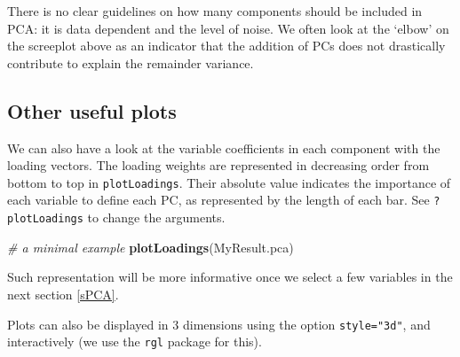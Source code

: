 \documentclass[]{book}
\newenvironment{Shaded}{\begin{snugshade}}{\end{snugshade}}
\newcommand{\KeywordTok}[1]{\textcolor[rgb]{0.13,0.29,0.53}{\textbf{#1}}}
\newcommand{\DataTypeTok}[1]{\textcolor[rgb]{0.13,0.29,0.53}{#1}}
\newcommand{\DecValTok}[1]{\textcolor[rgb]{0.00,0.00,0.81}{#1}}
\newcommand{\FloatTok}[1]{\textcolor[rgb]{0.00,0.00,0.81}{#1}}
\newcommand{\StringTok}[1]{\textcolor[rgb]{0.31,0.60,0.02}{#1}}
\newcommand{\CommentTok}[1]{\textcolor[rgb]{0.56,0.35,0.01}{\textit{#1}}}
\newcommand{\OtherTok}[1]{\textcolor[rgb]{0.56,0.35,0.01}{#1}}
\newcommand{\OperatorTok}[1]{\textcolor[rgb]{0.81,0.36,0.00}{\textbf{#1}}}
\newcommand{\NormalTok}[1]{#1}
\theoremstyle{definition}
\theoremstyle{definition}
\theoremstyle{definition}
\theoremstyle{remark}
\begin{document}
There is no clear guidelines on how many components should be included
in PCA: it is data dependent and the level of noise. We often look at
the `elbow' on the screeplot above as an indicator that the addition of
PCs does not drastically contribute to explain the remainder variance.

\subsection{Other useful plots}\label{other-useful-plots}

We can also have a look at the variable coefficients in each component
with the loading vectors. The loading weights are represented in
decreasing order from bottom to top in \texttt{plotLoadings}. Their
absolute value indicates the importance of each variable to define each
PC, as represented by the length of each bar. See \texttt{?plotLoadings}
to change the arguments.

\begin{Shaded}
\begin{Highlighting}[]
\CommentTok{# a minimal example}
\KeywordTok{plotLoadings}\NormalTok{(MyResult.pca)}
\end{Highlighting}
\end{Shaded}

\begin{Shaded}
\end{Shaded}

Such representation will be more informative once we select a few
variables in the next section \ref{sPCA}.

Plots can also be displayed in 3 dimensions using the option
\texttt{style="3d"}, and interactively (we use the \texttt{rgl} package
for this).

\begin{Shaded}
\end{Shaded}
\end{document}
